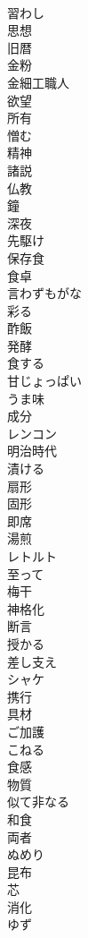 \documentclass[8pt]{extreport}
\begin{document}
\begin{CJK}{UTF8}{min}
\\	習わし
\\	思想
\\	旧暦
\\	金粉
\\	金細工職人
\\	欲望
\\	所有
\\	憎む
\\	精神
\\	諸説
\\	仏教
\\	鐘
\\	深夜
\\	先駆け
\\	保存食
\\	食卓
\\	言わずもがな
\\	彩る
\\	酢飯
\\	発酵
\\	食する
\\	甘じょっぱい
\\	うま味
\\	成分
\\	レンコン
\\	明治時代
\\	漬ける
\\	扇形
\\	固形
\\	即席
\\	湯煎
\\	レトルト
\\	至って
\\	梅干
\\	神格化
\\	断言
\\	授かる
\\	差し支え
\\	シャケ
\\	携行
\\	具材
\\	ご加護
\\	こねる
\\	食感
\\	物質
\\	似て非なる
\\	和食
\\	両者
\\	ぬめり
\\	昆布
\\	芯
\\	消化
\\	ゆず

\end{CJK}
\end{document}
